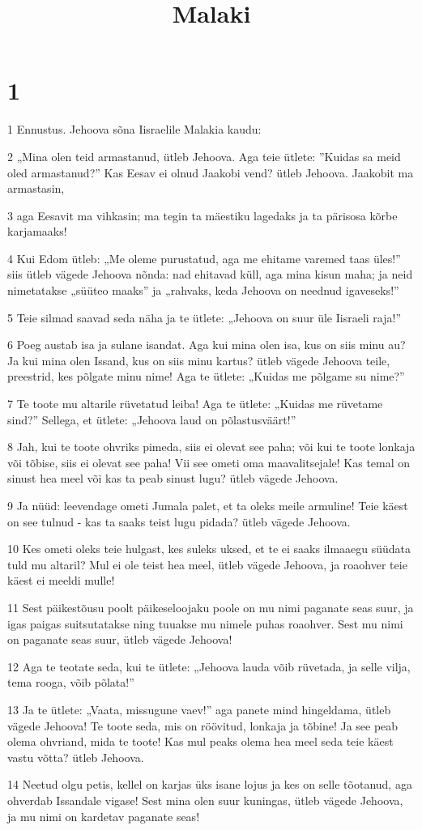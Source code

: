 

\title{Malaki}

\chapter{1}

\par 1 Ennustus. Jehoova sõna Iisraelile Malakia kaudu:
\par 2 „Mina olen teid armastanud, ütleb Jehoova. Aga teie ütlete: ”Kuidas sa meid oled armastanud?” Kas Eesav ei olnud Jaakobi vend? ütleb Jehoova. Jaakobit ma armastasin,
\par 3 aga Eesavit ma vihkasin; ma tegin ta mäestiku lagedaks ja ta pärisosa kõrbe karjamaaks!
\par 4 Kui Edom ütleb: „Me oleme purustatud, aga me ehitame varemed taas üles!” siis ütleb vägede Jehoova nõnda: nad ehitavad küll, aga mina kisun maha; ja neid nimetatakse „süüteo maaks” ja „rahvaks, keda Jehoova on neednud igaveseks!”
\par 5 Teie silmad saavad seda näha ja te ütlete: „Jehoova on suur üle Iisraeli raja!”
\par 6 Poeg austab isa ja sulane isandat. Aga kui mina olen isa, kus on siis minu au? Ja kui mina olen Issand, kus on siis minu kartus? ütleb vägede Jehoova teile, preestrid, kes põlgate minu nime! Aga te ütlete: „Kuidas me põlgame su nime?”
\par 7 Te toote mu altarile rüvetatud leiba! Aga te ütlete: „Kuidas me rüvetame sind?” Sellega, et ütlete: „Jehoova laud on põlastusväärt!”
\par 8 Jah, kui te toote ohvriks pimeda, siis ei olevat see paha; või kui te toote lonkaja või tõbise, siis ei olevat see paha! Vii see ometi oma maavalitsejale! Kas temal on sinust hea meel või kas ta peab sinust lugu? ütleb vägede Jehoova.
\par 9 Ja nüüd: leevendage ometi Jumala palet, et ta oleks meile armuline! Teie käest on see tulnud - kas ta saaks teist lugu pidada? ütleb vägede Jehoova.
\par 10 Kes ometi oleks teie hulgast, kes suleks uksed, et te ei saaks ilmaaegu süüdata tuld mu altaril? Mul ei ole teist hea meel, ütleb vägede Jehoova, ja roaohver teie käest ei meeldi mulle!
\par 11 Sest päikestõusu poolt päikeseloojaku poole on mu nimi paganate seas suur, ja igas paigas suitsutatakse ning tuuakse mu nimele puhas roaohver. Sest mu nimi on paganate seas suur, ütleb vägede Jehoova!
\par 12 Aga te teotate seda, kui te ütlete: „Jehoova lauda võib rüvetada, ja selle vilja, tema rooga, võib põlata!”
\par 13 Ja te ütlete: „Vaata, missugune vaev!” aga panete mind hingeldama, ütleb vägede Jehoova! Te toote seda, mis on röövitud, lonkaja ja tõbine! Ja see peab olema ohvriand, mida te toote! Kas mul peaks olema hea meel seda teie käest vastu võtta? ütleb Jehoova.
\par 14 Neetud olgu petis, kellel on karjas üks isane lojus ja kes on selle tõotanud, aga ohverdab Issandale vigase! Sest mina olen suur kuningas, ütleb vägede Jehoova, ja mu nimi on kardetav paganate seas!


